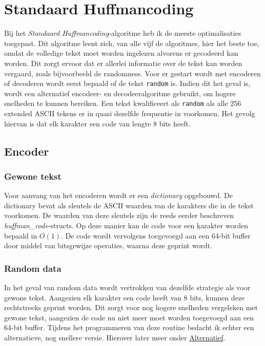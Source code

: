 \section{Standaard Huffmancoding}

Bij het \emph{Standaard Huffmancoding}-algoritme heb ik de meeste optimalisaties toegepast. Dit algoritme leent zich, van alle vijf de algoritmes, hier het beste toe, omdat de volledige tekst moet worden ingelezen alvorens er gecodeerd kan worden. Dit zorgt ervoor dat er allerlei informatie over de tekst kan worden vergaard, zoals bijvoorbeeld de randomness. Voor er gestart wordt met encoderen of decoderen wordt eerst bepaald of de tekst \texttt{random} is. Indien dit het geval is, wordt een alternatief encodeer- en decodeeralgoritme gebruikt, om hogere snelheden te kunnen bereiken. Een tekst kwalificeert als \texttt{random} als alle 256 extended ASCII tekens er in quasi dezelfde frequentie in voorkomen. Het gevolg hiervan is dat elk karakter een code van lengte 8 bits heeft.

\subsection{Encoder}

\subsubsection{Gewone tekst}
Voor aanvang van het encoderen wordt er een \emph{dictionary} opgebouwd. De dictionary bevat als sleutels de ASCII waarden van de karakters die in de tekst voorkomen. De waarden van deze sleutels zijn de reeds eerder beschreven \emph{huffman\_code}-structs. Op deze manier kan de code voor een karakter worden bepaald in $O(1)$. De code wordt vervolgens toegevoegd aan een 64-bit buffer door middel van bitsgewijze operaties, waarna deze geprint wordt.
	
\subsubsection{Random data}
In het geval van random data wordt vertrokken van dezelfde strategie als voor gewone tekst. Aangezien elk karakter een code heeft van 8 bits, kunnen deze rechtstreeks geprint worden. Dit zorgt voor nog hogere snelheden vergeleken met gewone tekst, aangezien de code nu niet meer moet worden toegevoegd aan een 64-bit buffer. Tijdens het programmeren van deze routine bedacht ik echter een alternatieve, nog snellere versie. Hierover later meer onder \hyperref[impl:std:alt]{Alternatief}.

